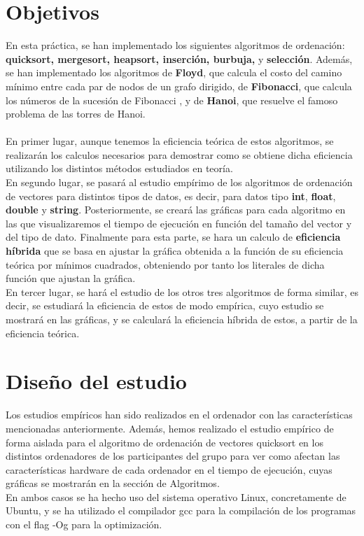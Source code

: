\documentclass[11pt]{article}
\newcommand{\negrita}[1]{\textbf{#1}}
\begin{document}
\section{Objetivos}
    En esta práctica, se han implementado los siguientes algoritmos de ordenación: \negrita{quicksort, mergesort, heapsort, inserción, burbuja,}
    y \negrita{selección}. Además, se han implementado los algoritmos de \negrita{Floyd}, que calcula el costo del camino mínimo entre cada par de nodos 
    de un grafo dirigido, de \negrita{Fibonacci}, que calcula los números de la sucesión de Fibonacci , y de \negrita{Hanoi}, que resuelve el famoso 
    problema de las torres de Hanoi. \\ \\
    En primer lugar, aunque tenemos la eficiencia teórica de estos algoritmos, se realizarán los calculos necesarios para demostrar
    como se obtiene dicha eficiencia utilizando los distintos métodos estudiados en teoría. \\
    En segundo lugar, se pasará al estudio empírimo de los algoritmos de ordenación de vectores para distintos tipos de datos, es decir, 
    para datos tipo \negrita{int}, \negrita{float}, \negrita{double} y \negrita{string}. Posteriormente, se creará las gráficas para
    cada algoritmo en las que visualizaremos el tiempo de ejecución en función del tamaño del vector y del tipo de dato. Finalmente 
    para esta parte, se hara un calculo de \negrita{eficiencia híbrida} que se basa en ajustar la gráfica obtenida a la función de su eficiencia
    teórica por mínimos cuadrados, obteniendo por tanto los literales de dicha función que ajustan la gráfica.\\
    En tercer lugar, se hará el estudio de los otros tres algoritmos de forma similar, es decir, se estudiará la eficiencia
    de estos de modo empírica, cuyo estudio se mostrará en las gráficas, y se calculará la eficiencia híbrida de estos, a partir
    de la eficiencia teórica.\\ 
\section{Diseño del estudio}
    \newcommand{\mivar}{ordenación de vectores quicksort}
    Los estudios empíricos han sido realizados en el ordenador con las características mencionadas anteriormente.
    Además, hemos realizado el estudio empírico de forma aislada para el algoritmo de ordenación de vectores
    quicksort en los distintos ordenadores de los participantes del grupo para ver como afectan las características
    hardware de cada ordenador en el tiempo de ejecución, cuyas gráficas se mostrarán en la sección de Algoritmos. \\
    En ambos casos se ha hecho uso del sistema operativo Linux, concretamente de Ubuntu, y se ha utilizado el
    compilador gcc para la compilación de los programas  con el flag -Og para la optimización.
\end{document}
